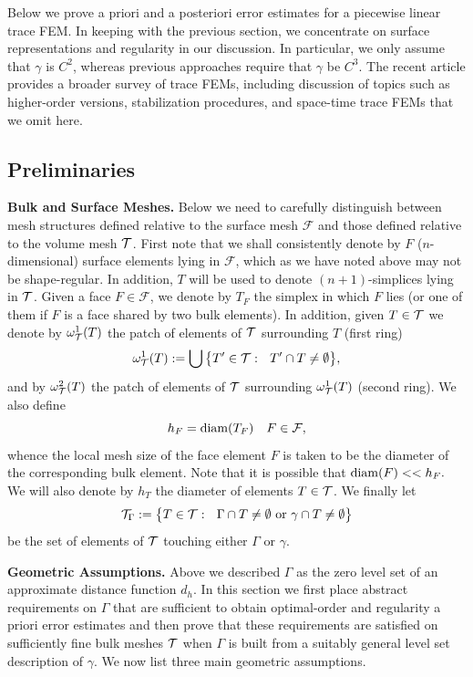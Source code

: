Below we prove a priori and a posteriori error estimates for a piecewise linear trace FEM.  In keeping with the previous section, we concentrate on surface representations and regularity in our discussion.  In particular, we only assume that $\gamma$ is $C^2$, whereas previous approaches require that $\gamma$ be $C^3$.  The recent article \cite{OR17} provides a broader survey of trace FEMs, including discussion of topics such as higher-order versions, stabilization procedures, and space-time trace FEMs that we omit here.  

\subsection{Preliminaries}\label{S:trace-prelim}

{\bf Bulk and Surface Meshes.}
Below we need to carefully distinguish between mesh structures defined relative to the surface mesh $\mathcal{F}$ and those defined relative to the volume mesh $\mathcal{T}$.  First note that we shall consistently denote by $F$ ($n$-dimensional) surface elements lying in $\mathcal{F}$, which as we have noted above may not be shape-regular.  In addition, $T$ will be used to denote $(n+1)$-simplices lying in $\mathcal{T}$.  Given a face $F \in \mathcal{F}$, we denote by $T_F$ the simplex in which $F$ lies (or one of them if $F$ is a face shared by two bulk elements).  In addition, given $T \in \mathcal{T}$ we denote by $\omega_{\mathcal{T}}^1(T)$ the patch of elements of $\mathcal{T}$ surrounding $T$ (first ring)
%
\[
\omega_{\mathcal{T}}^1(T) := \bigcup \big\{T'\in\mathcal{T}: ~~ T'\cap T \neq \emptyset  \big\},
\]
%
and by $\omega_{\mathcal{T}}^2(T)$ the patch of elements of $\mathcal{T}$ surrounding $\omega_{\mathcal{T}}^1(T)$ (second ring). We also define 
%
$$h_F={\rm diam}(T_F) \quad F \in \mathcal{F},$$
%
whence the local mesh size of the face element $F$ is taken to be the diameter of the corresponding bulk element.   Note that it is possible that ${\rm diam}(F) << h_F.$  We will also denote by $h_T$ the diameter of elements $T\in\mathcal{T}$. We finally let
%
$$\mathcal{T}_\Gamma := \big\{T \in \mathcal{T}: ~~ \Gamma \cap T \neq \emptyset \hbox{ or } \gamma \cap T \neq \emptyset \big\}$$
%
be the set of elements of $\mathcal{T}$ touching either $\Gamma$ or $\gamma$.  

\medskip\noindent
{\bf Geometric Assumptions.}  %
Above we described $\Gamma$ as the zero level set of an approximate distance function $d_h$.  In this section we first place abstract requirements on $\Gamma$ that are sufficient to obtain optimal-order and regularity a priori error estimates and then prove that these requirements are satisfied on sufficiently fine bulk meshes $\mathcal{T}$ when $\Gamma$ is built from a suitably general level set description of $\gamma$.   We now list three main geometric assumptions.

